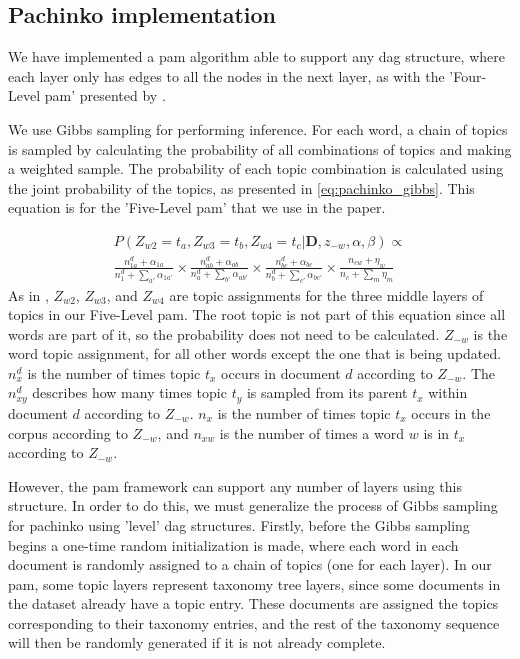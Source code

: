 \subsection{Pachinko implementation}
We have implemented a \acrfull{pam} algorithm able to support any \gls{dag} structure, where each layer only has edges to all the nodes in the next layer, as with the 'Four-Level \gls{pam}' presented by \citet{li2006pachinko}.

We use Gibbs sampling for performing inference.
For each word, a chain of topics is sampled by calculating the probability of all combinations of topics and making a weighted sample.
The probability of each topic combination is calculated using the joint probability of the topics, as presented in \autoref{eq:pachinko_gibbs}. This equation is for the 'Five-Level \gls{pam}' that we use in the paper.

\begin{equation}\label{eq:pachinko_gibbs}
	\begin{split}
		P(Z_{w2} = t_a, Z_{w3} = t_b, Z_{w4} = t_c | \textbf{D}, z_{-w}, \alpha, \beta) \propto \\
		\frac{n_{1a}^d + \alpha_{1a}}{n_1^d + \sum_{a'} \alpha_{1a'}} \times
		\frac{n_{ab}^d + \alpha_{ab}}{n_a^d + \sum_{b'} \alpha_{ab'}}  \times 
		\frac{n_{bc}^d + \alpha_{bc}}{n_{b}^d + \sum_{c'} \alpha_{bc'}} \times 
		\frac{n_{cw} + \eta_{w}}{n_{c} + \sum_{m} \eta_{m}} 
	\end{split}
\end{equation}
As in \citet{li2006pachinko}, $Z_{w2}$, $Z_{w3}$, and $Z_{w4}$ are topic assignments for the three middle layers of topics in our Five-Level \gls{pam}.
The root topic is not part of this equation since all words are part of it, so the probability does not need to be calculated.
$Z_{-w}$ is the word topic assignment, for all other words except the one that is being updated.
$n_x^d$ is the number of times topic $t_x$ occurs in document $d$ according to $Z_{-w}$. 
The $n_{xy}^d$ describes how many times topic $t_y$ is sampled from its parent $t_x$ within document $d$ according to $Z_{-w}$.
$n_x$ is the number of times topic $t_x$ occurs in the corpus according to $Z_{-w}$, and $n_{xw}$ is the number of times a word $w$ is in $t_x$ according to $Z_{-w}$.

However, the \gls{pam} framework can support any number of layers using this structure.
In order to do this, we must generalize the process of Gibbs sampling for pachinko using 'level' \gls{dag} structures.
Firstly, before the Gibbs sampling begins a one-time random initialization is made, where each word in each document is randomly assigned to a chain of topics (one for each layer).
In our \gls{pam}, some topic layers represent taxonomy tree layers, since some documents in the dataset already have a topic entry.
These documents are assigned the topics corresponding to their taxonomy entries, and the rest of the taxonomy sequence will then be randomly generated if it is not already complete.

